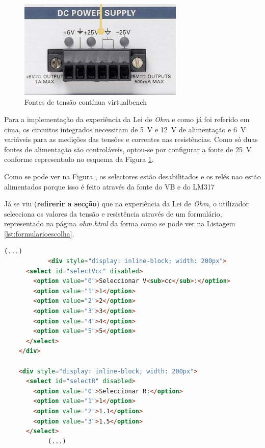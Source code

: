 \begin{figure}[hbtp]
	\centering
	\includegraphics[width=0.7\textwidth]{figures/fontes_VB.png}
	\caption{Fontes de tensão contínua \acrshort{virtualbench}}
	\label{fig:fontes_VB}
\end{figure}

Para a implementação da experiência da Lei de \textit{Ohm} e como já foi referido em cima, os circuitos integrados necessitam de \SI{5}{\volt} e \SI{12}{\volt} de alimentação e \SI{6}{\volt} variáveis para as medições das tensões e correntes nas resistências. Como só duas fontes de alimentação são controláveis, optou-se por configurar a fonte de \SI{25}{\volt} conforme representado no esquema da Figura \ref{fig:fontes_VB}.

Como se pode ver na Figura , os selectores estão desabilitados e os relés nao estão alimentados porque isso é feito através da fonte do VB e do LM317

Já se viu (\textbf{refirerir a secção}) que na experiência da Lei de \textit{Ohm}, o utilizador selecciona os valores da tensão e resistência através de um formulário, representado na página \textit{ohm.html} da forma como se pode ver na Listagem \ref{lst:formularioescolha}.

\begin{center}
	\begin{minipage}{0.7\linewidth}
		\begin{lstlisting}[language=html, caption=Formulário de escolha na página \textit{ohm.html},label=lst:formularioescolha]
			(...)
			<div style="display: inline-block; width: 200px">
      <select id="selectVcc" disabled>
        <option value="0">Seleccionar V<sub>cc</sub>:</option>
        <option value="1">1</option>
        <option value="2">2</option>
        <option value="3">3</option>
        <option value="4">4</option>
        <option value="5">5</option>
      </select>
    </div>

    <div style="display: inline-block; width: 200px">
      <select id="selectR" disabled>
        <option value="0">Seleccionar R:</option>
        <option value="1">1</option>
        <option value="2">1.1</option>
        <option value="3">1.5</option>
      </select>
			(...)
	\end{lstlisting}
	\end{minipage}
\end{center}

